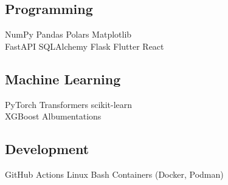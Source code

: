 \documentclass[]{resume-template}
\begin{document}
\begin{minipage}[t]{0.33\textwidth}
  \subsection{Programming}\label{subsec:programming}
  NumPy\textbullet{} Pandas\textbullet{} Polars\textbullet{} Matplotlib\\
  FastAPI \textbullet{} SQLAlchemy \textbullet{} Flask
  \newline{}
  Flutter \textbullet{} React

  \vspace*{1pt}
  \subsection{Machine Learning}\label{subsec:mltools}
  PyTorch \textbullet{} Transformers \textbullet{} scikit-learn \\
  XGBoost \textbullet{} Albumentations

  \vspace*{1pt}
  \subsection{Development}
  GitHub Actions\textbullet{}  Linux \textbullet{} Bash \textbullet{} Containers (Docker, Podman)



\end{minipage}
\end{document}

